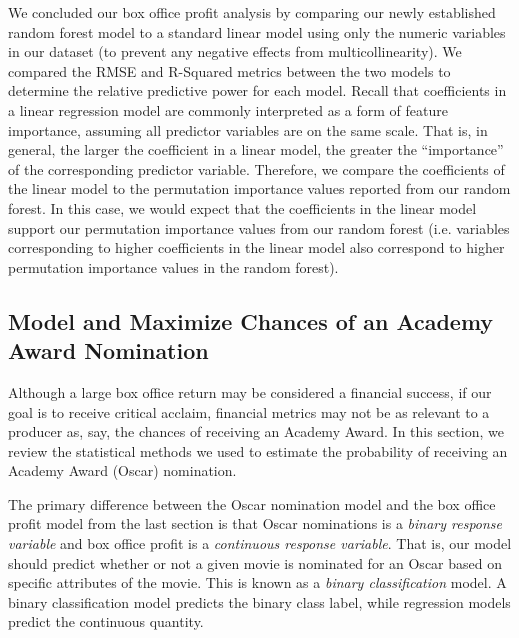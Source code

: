 \documentclass[10pt]{article}
\begin{document}
We concluded our box office profit analysis by comparing our newly established random forest model to a standard linear model using only the numeric variables in our dataset (to prevent any negative effects from multicollinearity). We compared the RMSE and R-Squared metrics between the two models to determine the relative predictive power for each model. Recall that coefficients in a linear regression model are commonly interpreted as a form of feature importance, assuming all predictor variables are on the same scale. That is, in general, the larger the coefficient in a linear model, the greater the “importance” of the corresponding predictor variable. Therefore, we compare the coefficients of the linear model to the permutation importance values reported from our random forest. In this case, we would expect that the coefficients in the linear model support our permutation importance values from our random forest (i.e. variables corresponding to higher coefficients in the linear model also correspond to higher permutation importance values in the random forest).  

\subsection{Model and Maximize Chances of an Academy Award Nomination}

Although a large box office return may be considered a financial success, if our goal is to receive critical acclaim, financial metrics may not be as relevant to a producer as, say, the chances of receiving an Academy Award. In this section, we review the statistical methods we used to estimate the probability of receiving an Academy Award (Oscar) nomination. 

The primary difference between the Oscar nomination model and the box office profit model from the last section is that Oscar nominations is a \textit{binary response variable} and box office profit is a \textit{continuous response variable}. That is, our model should predict whether or not a given movie is nominated for an Oscar based on specific attributes of the movie. This is known as a \textit{binary classification} model. A binary classification model predicts the binary class label, while regression models predict the continuous quantity.
\end{document}
